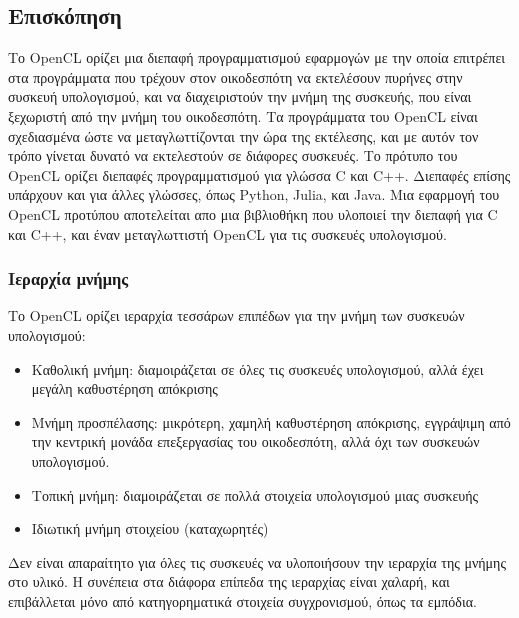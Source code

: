 \subsection{Επισκόπηση}
Το OpenCL ορίζει μια διεπαφή προγραμματισμού εφαρμογών με την οποία επιτρέπει στα προγράμματα που τρέχουν στον οικοδεσπότη να εκτελέσουν πυρήνες στην συσκευή υπολογισμού, και να διαχειριστούν την μνήμη της συσκευής, που είναι ξεχωριστή από την μνήμη του οικοδεσπότη. Τα προγράμματα του OpenCL είναι σχεδιασμένα ώστε να μεταγλωττίζονται την ώρα της εκτέλεσης, και με αυτόν τον τρόπο γίνεται δυνατό να εκτελεστούν σε διάφορες συσκευές. Το πρότυπο του OpenCL ορίζει διεπαφές προγραμματισμού για γλώσσα C και C++. Διεπαφές επίσης υπάρχουν και για άλλες γλώσσες, όπως Python, Julia, και Java.\cite{opencl-2} Μια εφαρμογή του OpenCL προτύπου αποτελείται απο μια βιβλιοθήκη που υλοποιεί την διεπαφή για C και C++, και έναν μεταγλωττιστή OpenCL για τις συσκευές υπολογισμού.\\
\subsubsection{Ιεραρχία μνήμης}
Το OpenCL ορίζει ιεραρχία τεσσάρων επιπέδων για την μνήμη των συσκευών υπολογισμού:
\begin{itemize}
\item Καθολική μνήμη: διαμοιράζεται σε όλες τις συσκευές υπολογισμού, αλλά έχει μεγάλη καθυστέρηση απόκρισης
\item Μνήμη προσπέλασης: μικρότερη, χαμηλή καθυστέρηση απόκρισης, εγγράψιμη από την κεντρική μονάδα επεξεργασίας του οικοδεσπότη, αλλά όχι των συσκευών υπολογισμού.
\item Τοπική μνήμη: διαμοιράζεται σε πολλά στοιχεία υπολογισμού μιας συσκευής
\item Ιδιωτική μνήμη στοιχείου (καταχωρητές) 
\end{itemize}   
Δεν είναι απαραίτητο για όλες τις συσκευές να υλοποιήσουν την ιεραρχία της μνήμης στο υλικό. Η συνέπεια στα διάφορα επίπεδα της ιεραρχίας είναι χαλαρή, και επιβάλλεται μόνο από κατηγορηματικά στοιχεία συγχρονισμού, όπως τα εμπόδια.
